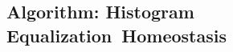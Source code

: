\documentclass[vision,article,accept,oneauthor,pdftex]{Definitions/mdpi}
\newcommand{\seeFig}[1]{Figure~\ref{fig:#1}}%
\begin{document}
\begin{figure}[H]
{%
\label{fig:HEH}}%
\end{figure}%
\subsection{Algorithm: Histogram Equalization~Homeostasis}\label{HEH}
\end{document}
